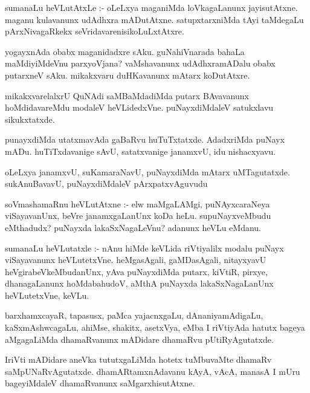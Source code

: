 \documentclass{article}
\begin{document}
\begin{mn}
sumanaLu heVLutAtxLe :- oLeLxya maganiMda loVkagaLanunx jayisutAtxne.
 maganu kulavanunx udAdhxra mADutAtxne. satupxtarxniMda tAyi taMdegaLu 
 pArxNivagaRkekx seVridavarenisikoLuLxtAtxre. 
\end{mn}

\begin{mn}
yogayxnAda obabx maganidadxre sAku.  guNahiVnarada bahaLa maMdiyiMdeVnu 
parxyoVjana?  vaMshavanunx udAdhxramADalu obabx putarxneV sAku. mikakxvaru
duHKavanunx mAtarx koDutAtxre.
\end{mn}

\begin{mn}
mikakxvarelalxrU QuNAdi saMBaMdadiMda putarx BAvavanunx hoMdidavareMdu 
modaleV heVLidedxVne. puNayxdiMdaleV satukxlavu sikukxtatxde. 
\end{mn}

\begin{mn}
punayxdiMda utatxmavAda gaBaRvu huTuTxtatxde. AdadxriMda puNayx mADu.
 huTiTxdavanige sAvU, satatxvanige janamxvU, idu nishacxyavu.
\end{mn}

\begin{mn}
oLeLxya janamxvU, suKamaraNavU, puNayxdiMda mAtarx uMTagutatxde. sukAnuBavavU, 
puNayxdiMdaleV pArxpatxvAguvudu
\end{mn}

\begin{mn}
soVmashamaRnu heVLutAtxne :- elw maMgaLAMgi, puNAyxcaraNeya viSayavanUnx,
 beVre janamxgaLanUnx koDa heLu. supuNayxveMbudu eMthadudx?  puNayxda 
 lakaSxNagaLeVnu? adanunx heVLu eMdanu.
\end{mn}

\begin{mn}
sumanaLu heVLutatxle :- nAnu hiMde keVLida riVtiyalilx modalu puNayx viSayavanunx 
heVLutetxVne. heMgasAgali, gaMDasAgali, nitayxyavU heVgirabeVkeMbudanUnx, 
yAva puNayxdiMda putarx, kiVtiR, pirxye, dhanagaLanunx hoMdabahudoV, aMthA 
puNayxda lakaSxNagaLanUnx heVLutetxVne, keVLu.
\end{mn}

\begin{mn}
barxhamxcayaR, tapasusx, paMca yajacnxgaLu, dAnaniyamAdigaLu, kaSxmAshwcagaLu, 
ahiMse, shakitx, asetxVya, eMba I riVtiyAda  hatutx bageya aMgagaLiMda 
dhamaRvanunx mADidare dhamaRvu pUtiRyAgutatxde. 
\end{mn}

\begin{mn}
IriVti mADidare aneVka  tututxgaLiMda hotetx tuMbuvaMte dhamaRv 
saMpUNaRvAgutatxde. dhamARtamxnAdavanu kAyA, vAcA, manasA I mUru 
bageyiMdaleV dhamaRvanunx saMgarxhisutAtxne.
\end{mn}
\end{document}
